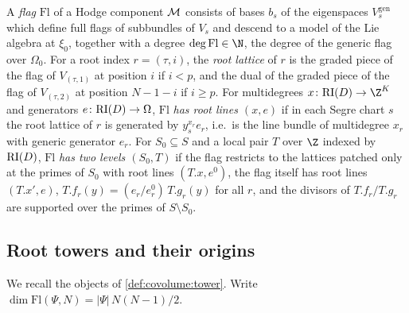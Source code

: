\begin{definition}\label{pf:towergeo:def-flag}
A \emph{flag} $\mathrm{Fl}$ of a Hodge component $\mathcal M$ consists of bases $b_s$ of the eigenspaces
$V^{\mathrm{gen}}_s$ which define full flags of subbundles of $V_s$ and descend to a model of the Lie
algebra at $\xi_0$, together with a degree $\deg\mathrm{Fl}\in\N$, the degree of the generic flag over
$\Omega_0$. For a root index $r=(\tau,i)$, the \emph{root lattice} of $r$ is the graded piece of the flag
of $V_{(\tau,1)}$ at position $i$ if $i<p$, and the dual of the graded piece of the flag of $V_{(\tau,2)}$
at position $N-1-i$ if $i\ge p$. For multidegrees $x\colon\towergeoRI(D)\to\Z^K$ and generators
$e\colon\mathrm{RI}(D)\to\Omega$, $\mathrm{Fl}$ \emph{has root lines $(x,e)$} if in each Segre chart $s$
the root lattice of $r$ is generated by $y_s^{x_r}e_r$, i.e.\ is the line bundle of multidegree $x_r$ with
generic generator $e_r$. For $S_0\subseteq S$ and a local pair $T$ over $\Z$ indexed by $\mathrm{RI}(D)$,
$\mathrm{Fl}$ \emph{has two levels $(S_0,T)$} if the flag restricts to the lattices patched only at the
primes of $S_0$ with root lines $(T.x,e^0)$, the flag itself has root lines $(T.x',e)$,
$T.f_r(y)=(e_r/e^0_r)\,T.g_r(y)$ for all $r$, and the divisors of $T.f_r/T.g_r$ are supported over the
primes of $S\setminus S_0$.
\end{definition}

\subsection{Root towers and their origins}\label{pf:towergeo:sec-towers}

We recall the objects of \cref{def:covolume:tower}. Write $\dim\mathrm{Fl}(\Psi,N)=|\Psi|\,N(N-1)/2$.

